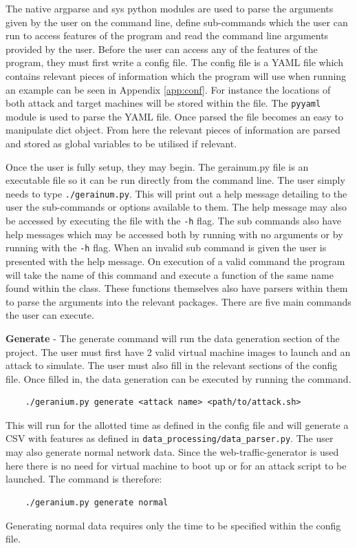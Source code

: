 The native argparse and sys python modules are used to parse the arguments given by the user on the command line, define sub-commands which the user can run to access features of the program and read the command line arguments provided by the user. Before the user can access any of the features of the program, they must first write a config file. The config file is a YAML file which contains relevant pieces of information which the program will use when running an example can be seen in Appendix \ref{app:conf}. For instance the locations of both attack and target machines will be stored within the file. The \texttt{pyyaml} module is used to parse the YAML file. Once parsed the file becomes an easy to manipulate dict object. From here the relevant pieces of information are parsed and stored as global variables to be utilised if relevant.

Once the user is fully setup, they may begin. The gerainum.py file is an executable file so it can be run directly from the command line. The user simply needs to type \texttt{./gerainum.py}. This will print out a help message detailing to the user the sub-commands or options available to them. The help message may also be accessed by executing the file with the \texttt{-h} flag. The sub commands also have help messages which may be accessed both by running with no arguments or by running with the \texttt{-h} flag. When an invalid sub command is given the user is presented with the help message.  On execution of a valid command the program will take the name of this command and execute a function of the same name found within the class. These functions themselves also have parsers within them to parse the arguments into the relevant packages. There are five main commands the user can execute. 

\textbf{Generate} - The generate command will run the data generation section of the project. The user must first have 2 valid virtual machine images to launch and an attack to simulate. The user must also fill in the relevant sections of the config file. Once filled in, the data generation can be executed by running the command. 
\begin{verbatim}
    ./geranium.py generate <attack name> <path/to/attack.sh>
\end{verbatim}
This will run for the allotted time as defined in the config file and will generate a CSV with features as defined in \texttt{data\_processing/data\_parser.py}. The user may also generate normal network data. Since the web-traffic-generator \cite{wtg} is used here there is no need for virtual machine to boot up or for an attack script to be launched. The command is therefore:
\begin{verbatim}
    ./geranium.py generate normal
\end{verbatim}
Generating normal data requires only the time to be specified within the config file.

